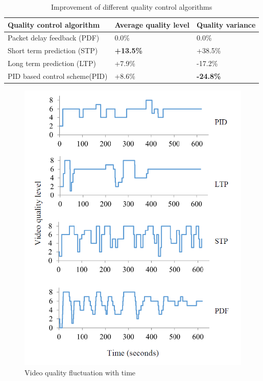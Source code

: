 \documentclass[journal]{IEEEtran}
\begin{document}
\begin{table}[t]
\centering
\caption{Improvement of different quality control algorithms}
\label{tab:improvement}
\begin{tabular}[b]{p{4.2cm}<{\centering}|p{4.2cm}<{\centering}|p{4.2cm}<{\centering}}
\hline \hline
Quality control algorithm & Average quality level & Quality variance \\ \hline
Packet delay feedback (PDF) & 0.0\% & 0.0\% \\ \hline
Short term prediction (STP) & \textbf{+13.5\%} & +38.5\% \\ \hline
Long term prediction (LTP) & +7.9\% & -17.2\% \\ \hline
PID based control scheme(PID) & +8.6\% & \textbf{-24.8\%} \\ \hline
\end{tabular}
\end{table}


\begin{figure}
\centering
\includegraphics[width = 0.9\linewidth]{Fluctuation.png}
\caption{Video quality fluctuation with time \label{fig:fluctuation}}
\end{figure}
\end{document}
